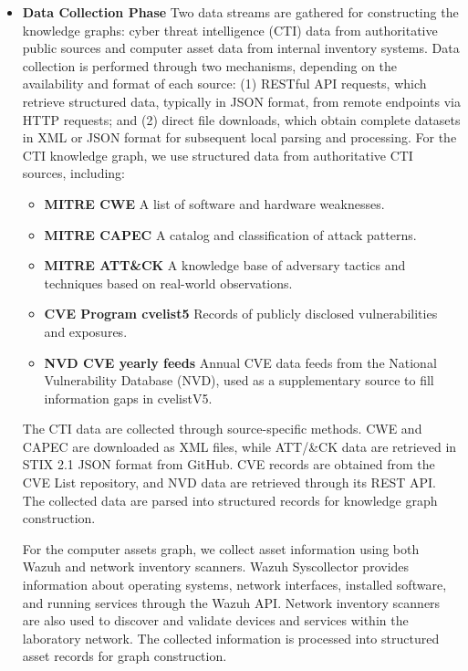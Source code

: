 \documentclass[conference]{IEEEtran}
\begin{document}
    \begin{itemize}
        \item \textbf{Data Collection Phase} Two data streams are gathered for constructing the knowledge graphs: cyber threat intelligence (CTI) data from authoritative public sources and computer asset data from internal inventory systems. Data collection is performed through two mechanisms, depending on the availability and format of each source: (1) RESTful API requests, which retrieve structured data, typically in JSON format, from remote endpoints via HTTP requests; and (2) direct file downloads, which obtain complete datasets in XML or JSON format for subsequent local parsing and processing. For the CTI knowledge graph, we use structured data from authoritative CTI sources, including:
            \begin{itemize}
                \item \textbf{MITRE CWE} A list of software and hardware weaknesses.
                \item \textbf{MITRE CAPEC} A catalog and classification of attack patterns.
                \item \textbf{MITRE ATT\&CK} A knowledge base of adversary tactics and techniques based on real-world observations.
                \item \textbf{CVE Program cvelist5} Records of publicly disclosed vulnerabilities and exposures.
                \item \textbf{NVD CVE yearly feeds} Annual CVE data feeds from the National Vulnerability Database (NVD), used as a supplementary source to fill information gaps in cvelistV5.
            \end{itemize}
           The CTI data are collected through source-specific methods. CWE and CAPEC are downloaded as XML files, while ATT/\&CK data are retrieved in STIX 2.1 JSON format from GitHub. CVE records are obtained from the CVE List repository, and NVD data are retrieved through its REST API. The collected data are parsed into structured records for knowledge graph construction.

           For the computer assets graph, we collect asset information using both Wazuh and network inventory scanners. Wazuh Syscollector provides information about operating systems, network interfaces, installed software, and running services through the Wazuh API. Network inventory scanners are also used to discover and validate devices and services within the laboratory network. The collected information is processed into structured asset records for graph construction.


\end{itemize}
\end{document}
